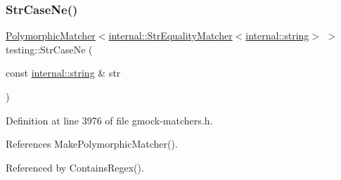\subsubsection{\texorpdfstring{Str\+Case\+Ne()}{StrCaseNe()}}
{\footnotesize\ttfamily \hyperlink{classtesting_1_1PolymorphicMatcher}{Polymorphic\+Matcher}$<$\hyperlink{classtesting_1_1internal_1_1StrEqualityMatcher}{internal\+::\+Str\+Equality\+Matcher}$<$\hyperlink{namespacetesting_1_1internal_a8e8ff5b11e64078831112677156cb111}{internal\+::string}$>$ $>$ testing\+::\+Str\+Case\+Ne (\begin{DoxyParamCaption}\item[{const \hyperlink{namespacetesting_1_1internal_a8e8ff5b11e64078831112677156cb111}{internal\+::string} \&}]{str }\end{DoxyParamCaption})\hspace{0.3cm}{\ttfamily [inline]}}



Definition at line 3976 of file gmock-\/matchers.\+h.



References Make\+Polymorphic\+Matcher().



Referenced by Contains\+Regex().


